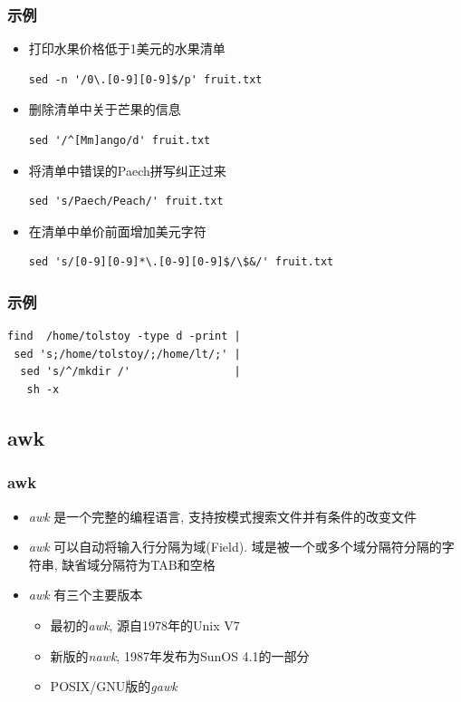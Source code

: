 \documentclass[compress]{beamer}
\begin{document}
\begin{frame}[fragile]
\frametitle{示例}

\begin{itemize}
\item 打印水果价格低于1美元的水果清单\\
\begin{Verbatim}
sed -n '/0\.[0-9][0-9]$/p' fruit.txt
\end{Verbatim}

\item 删除清单中关于芒果的信息\\
\begin{Verbatim}
sed '/^[Mm]ango/d' fruit.txt
\end{Verbatim}

\item 将清单中错误的Paech拼写纠正过来\\
\begin{Verbatim}
sed 's/Paech/Peach/' fruit.txt
\end{Verbatim}

\item 在清单中单价前面增加美元字符\\
\begin{Verbatim}
sed 's/[0-9][0-9]*\.[0-9][0-9]$/\$&/' fruit.txt
\end{Verbatim}
\end{itemize}

\end{frame}

\begin{frame}[fragile]
\frametitle{示例}
\begin{Verbatim}
find  /home/tolstoy -type d -print |
 sed 's;/home/tolstoy/;/home/lt/;' |
  sed 's/^/mkdir /'                |
   sh -x
\end{Verbatim}
\end{frame}

\subsection{awk}

\begin{frame}
\frametitle{awk}

\begin{itemize}
\item \emph{awk} 是一个完整的编程语言, 支持按模式搜索文件并有条件的改变文件
\item \emph{awk} 可以自动将输入行分隔为域(Field). 域是被一个或多个域分隔符分隔的字符串,
缺省域分隔符为TAB和空格
\item \emph{awk} 有三个主要版本
    \begin{itemize}
    \item 最初的\emph{awk}, 源自1978年的Unix V7
    \item 新版的\emph{nawk}, 1987年发布为SunOS 4.1的一部分
    \item POSIX/GNU版的\emph{gawk}
    \end{itemize}
\end{itemize}
\end{frame}
\end{document}
